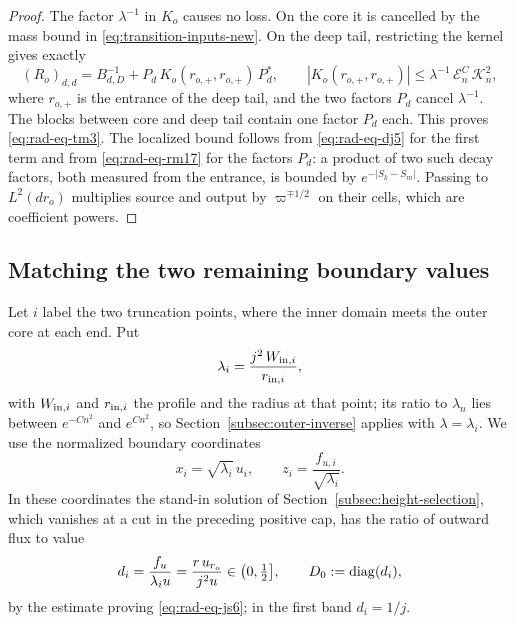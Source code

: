\begin{proof}
The factor $\lambda^{-1}$ in $K_o$ causes no loss. On the core it is
cancelled by the mass bound in \eqref{eq:transition-inputs-new}. On
the deep tail, restricting the kernel gives exactly
\[
 (R_o)_{d,d}=B_{d,D}^{-1}+P_d\,K_o(r_{o,+},r_{o,+})\,P_d^*,
 \qquad |K_o(r_{o,+},r_{o,+})|
        \le\lambda^{-1}\,\mathcal E_n^C\,\mathcal K_n^2 ,
\]
where $r_{o,+}$ is the entrance of the deep tail, and the two factors
$P_d$ cancel $\lambda^{-1}$. The blocks between core and deep tail
contain one factor $P_d$ each. This proves \eqref{eq:rad-eq-tm3}. The
localized bound follows from \eqref{eq:rad-eq-dj5} for the first term
and from \eqref{eq:rad-eq-rm17} for the factors $P_d$: a product of
two such decay factors, both measured from the entrance, is bounded
by $e^{-|S_k-S_m|}$. Passing to $L^2(dr_o)$ multiplies source and
output by $\varpi^{\mp1/2}$ on their cells, which are coefficient
powers.
\end{proof}

\subsection{Matching the two remaining boundary values}
\label{subsec:terminal-matching}

Let $i$ label the two truncation points, where the inner domain meets
the outer core at each end. Put
\[
 \lambda_i=\frac{j^2\,W_{{\rm in},i}}{r_{{\rm in},i}},
\]
with $W_{{\rm in},i}$ and $r_{{\rm in},i}$ the profile and the radius
at that point; its ratio to $\lambda_n$ lies between $e^{-Cn^2}$ and
$e^{Cn^2}$, so Section~\ref{subsec:outer-inverse} applies with
$\lambda=\lambda_i$. We use the normalized boundary coordinates
\[
 x_i=\sqrt{\lambda_i}\,u_i,\qquad z_i=\frac{f_{u,i}}{\sqrt{\lambda_i}} .
\]
In these coordinates the stand-in solution of
Section~\ref{subsec:height-selection}, which vanishes at a cut in the
preceding positive cap, has the ratio of outward flux to value
\[
 d_i=\frac{f_u}{\lambda_iu}=\frac{r\,u_{r_o}}{j^2u}
 \in\bigl(0,\tfrac12\bigr],
 \qquad D_0:=\operatorname{diag}(d_i),
\]
by the estimate proving \eqref{eq:rad-eq-js6}; in the first band
$d_i=1/j$.

